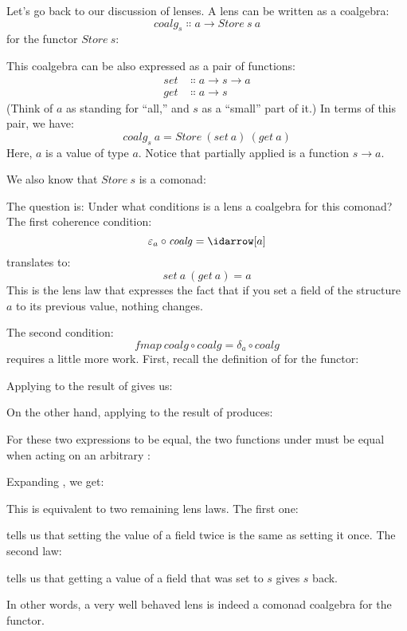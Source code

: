 Let's go back to our discussion of lenses. A lens can be written as a
coalgebra:
\[\mathit{coalg}_s \Colon a \to \mathit{Store}\ s\ a\]
for the functor $\mathit{Store}\ s$:

This coalgebra can be also expressed as a pair of functions:
\begin{align*}
  \mathit{set} & \Colon a \to s \to a \\
  \mathit{get} & \Colon a \to s
\end{align*}
(Think of $a$ as standing for ``all,'' and $s$ as a
``small'' part of it.) In terms of this pair, we have:
\[\mathit{coalg}_s\ a = \mathit{Store}\ (\mathit{set}\ a)\ (\mathit{get}\ a)\]
Here, $a$ is a value of type $a$. Notice that partially
applied  is a function $s \to a$.

We also know that $\mathit{Store}\ s$ is a comonad:

The question is: Under what conditions is a lens a coalgebra for this
comonad? The first coherence condition:
\[\varepsilon_a \circ \mathit{coalg} = \idarrow[a]\]
translates to:
\[\mathit{set}\ a\ (\mathit{get}\ a) = a\]
This is the lens law that expresses the fact that if you set a field of
the structure $a$ to its previous value, nothing changes.

The second condition:
\[\mathit{fmap}\ \mathit{coalg} \circ \mathit{coalg} = \delta_a \circ \mathit{coalg}\]
requires a little more work. First, recall the definition of
 for the  functor:

Applying  to the result of  gives us:

On the other hand, applying  to the result of
 produces:

For these two expressions to be equal, the two functions under
 must be equal when acting on an arbitrary :

Expanding , we get:

This is equivalent to two remaining lens laws. The first one:

tells us that setting the value of a field twice is the same as setting
it once. The second law:

tells us that getting a value of a field that was set to $s$
gives $s$ back.

In other words, a very well behaved lens is indeed a comonad coalgebra for
the  functor.

